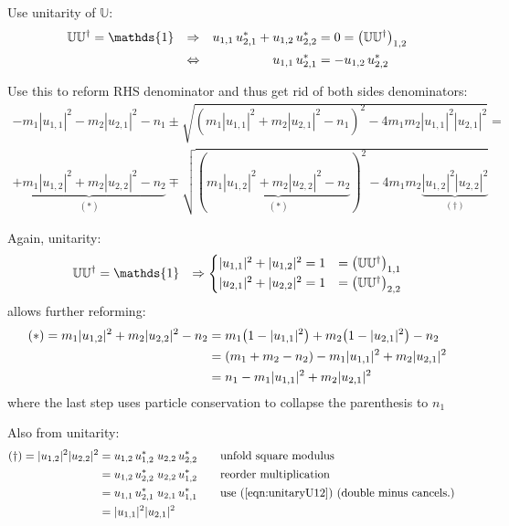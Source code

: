 \documentclass[
	english,
	a4paper,
	fontsize=10pt,
	parskip=half,
	titlepage=true,
	DIV=12,
	final
]{scrreprt}
\newcommand*{\Thus}{\ensuremath{\Rightarrow}\xspace}
\begin{document}
Use unitarity of $\mathbb{U}$: 
\begin{align}
	\mathbb{U}\mathbb{U}^{\dagger} &= \mathds{1}
&\Thus&&
	u_{1,1} \, u_{2,1}^{*} + u_{1,2} \, u_{2,2}^{*} &= 0 = \qty(\mathbb{U}\mathbb{U}^{\dagger})_{1,2} 
	\label{eqn:unitaryU12}
\\
&&\Leftrightarrow&&
u_{1,1} \, u_{2,1}^{*} &= -u_{1,2} \, u_{2,2}^{*}
\end{align}

Use this to reform RHS denominator and thus get rid of both sides denominators:
\begin{multline}
	- m_1 |u_{1,1}|^{2}  -  m_2 |u_{2,1}|^{2} - n_1
		\pm
		\sqrt{
			(m_1 |u_{1,1}|^{2}  +  m_2 |u_{2,1}|^{2} - n_1)^{2}
			-
			4 m_1 m_2 |u_{1,1}|^{2} |u_{2,1}|^{2}
		}
=\\
	\underbrace{+ m_1 |u_{1,2}|^{2}  +  m_2 |u_{2,2}|^{2} - n_2}_{(*)}
		\mp
		\sqrt{
			(\underbrace{m_1 |u_{1,2}|^{2}  +  m_2 |u_{2,2}|^{2} - n_2}_{(*)} )^{2}
			-
			4 m_1 m_2 \underbrace{|u_{1,2}|^{2} |u_{2,2}|^{2}}_{(\dagger)}
		}
\end{multline}

Again, unitarity:
\begin{align}
	\mathbb{U}\mathbb{U}^{\dagger} &= \mathds{1}
&\Thus
	\begin{cases}
		|u_{1,1}|^{2} + |u_{1,2}|^{2} = 1	& = \qty(\mathbb{U}\mathbb{U}^{\dagger})_{1,1}\\
		|u_{2,1}|^{2} + |u_{2,2}|^{2} = 1	& = \qty(\mathbb{U}\mathbb{U}^{\dagger})_{2,2}
	\end{cases}	
\end{align}
allows further reforming:
\begin{align}
	(*)
=
	m_1 |u_{1,2}|^{2}  +  m_2 |u_{2,2}|^{2} - n_2
&=
	m_1 \qty(1 - |u_{1,1}|^{2}) + m_2 \qty(1 - |u_{2,1}|^{2}) - n_2 \\
&=
	(m_1 + m_2 - n_2) - m_1 |u_{1,1}|^{2}  +  m_2 |u_{2,1}|^{2}\\
&=
	n_1 - m_1 |u_{1,1}|^{2}  +  m_2 |u_{2,1}|^{2}
\end{align}
where the last step uses particle conservation to collapse the parenthesis to $n_1$

Also from unitarity:
\begin{align}
	(\dagger) =
	|u_{1,2}|^{2} |u_{2,2}|^{2}
&=
	u_{1,2} \, u_{1,2}^{*} \; u_{2,2} \, u_{2,2}^{*} 
	&&\qq{unfold square modulus} \\
&=
	u_{1,2} \, u_{2,2}^{*} \; u_{2,2} \, u_{1,2}^{*}
	&&\qq{reorder multiplication}\\
&=
	u_{1,1} \, u_{2,1}^{*} \; u_{2,1} \, u_{1,1}^{*}
	&&\qq{use (\ref{eqn:unitaryU12}) (double minus cancels.)} \\
&=
	|u_{1,1}|^{2} |u_{2,1}|^{2}
\end{align}
\end{document}
